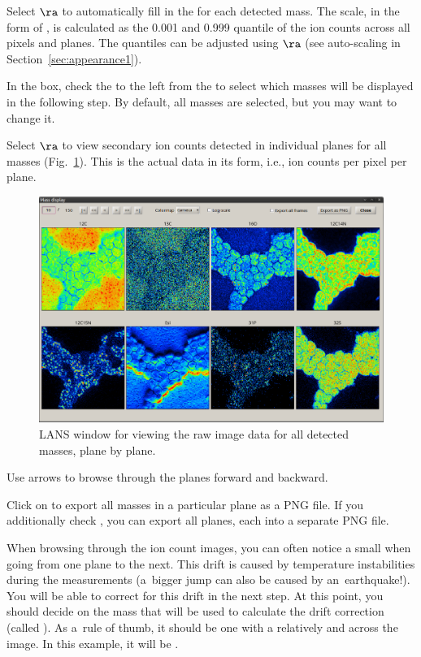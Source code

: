 \s Select  $\ra$  to automatically fill in the  for each detected mass. The scale, in the form of , is calculated as the 0.001 and 0.999 quantile of the ion counts across all pixels and planes. The quantiles can be adjusted using  $\ra$  (see auto-scaling in Section~\ref{sec:appearance1}). 

\s In the  box, check the   to the left from the  to select which masses will be displayed in the following step. By default, all masses are selected, but you may want to change it.

\s Select  $\ra$  to view secondary ion counts detected in individual planes for all masses (Fig.~\ref{fig:displayplanes}). This is the actual data in its  form, i.e., ion counts per pixel per plane.

\begin{figure}[!ht]
\centering
\includegraphics[width=\textwidth]{figs3/LANS-display-planes-raw}
\caption{\label{fig:displayplanes}%
LANS window for viewing the raw image data for all detected masses, plane by plane.}
\end{figure}

\bul Use arrows to browse through the planes forward and backward.

\bul Click on  to export all masses in a particular plane as a PNG file. If you additionally check , you can export all planes, each into a separate PNG file.

\bul
When browsing through the ion count images, you can often notice a small  when going from one plane to the next. This drift is caused by temperature instabilities during the measurements (a~bigger jump can also be caused by an~earthquake!). You will be able to correct for this drift in the next step. At this point, you should decide on the mass that will be used to calculate the drift correction (called ). As a~rule of thumb, it should be one with a relatively  and  across the image. In this example, it will be .


